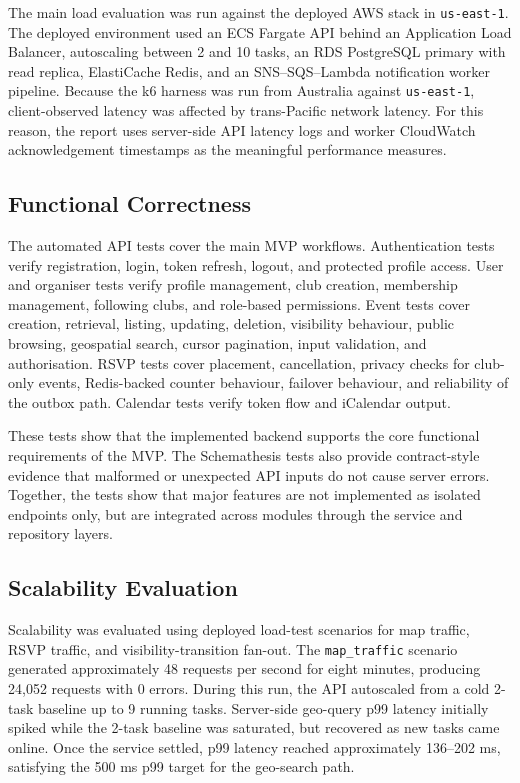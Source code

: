 The main load evaluation was run against the deployed AWS stack in \texttt{us-east-1}. The deployed environment used an ECS Fargate API behind an Application Load Balancer, autoscaling between 2 and 10 tasks, an RDS PostgreSQL primary with read replica, ElastiCache Redis, and an SNS--SQS--Lambda notification worker pipeline. Because the k6 harness was run from Australia against \texttt{us-east-1}, client-observed latency was affected by trans-Pacific network latency. For this reason, the report uses server-side API latency logs and worker CloudWatch acknowledgement timestamps as the meaningful performance measures.

\subsection{Functional Correctness}

The automated API tests cover the main MVP workflows. Authentication tests verify registration, login, token refresh, logout, and protected profile access. User and organiser tests verify profile management, club creation, membership management, following clubs, and role-based permissions. Event tests cover creation, retrieval, listing, updating, deletion, visibility behaviour, public browsing, geospatial search, cursor pagination, input validation, and authorisation. RSVP tests cover placement, cancellation, privacy checks for club-only events, Redis-backed counter behaviour, failover behaviour, and reliability of the outbox path. Calendar tests verify token flow and iCalendar output.

These tests show that the implemented backend supports the core functional requirements of the MVP. The Schemathesis tests also provide contract-style evidence that malformed or unexpected API inputs do not cause server errors. Together, the tests show that major features are not implemented as isolated endpoints only, but are integrated across modules through the service and repository layers.

\subsection{Scalability Evaluation}

Scalability was evaluated using deployed load-test scenarios for map traffic, RSVP traffic, and visibility-transition fan-out. The \verb|map_traffic| scenario generated approximately 48 requests per second for eight minutes, producing 24,052 requests with 0 errors. During this run, the API autoscaled from a cold 2-task baseline up to 9 running tasks. Server-side geo-query p99 latency initially spiked while the 2-task baseline was saturated, but recovered as new tasks came online. Once the service settled, p99 latency reached approximately 136--202 ms, satisfying the 500 ms p99 target for the geo-search path.

